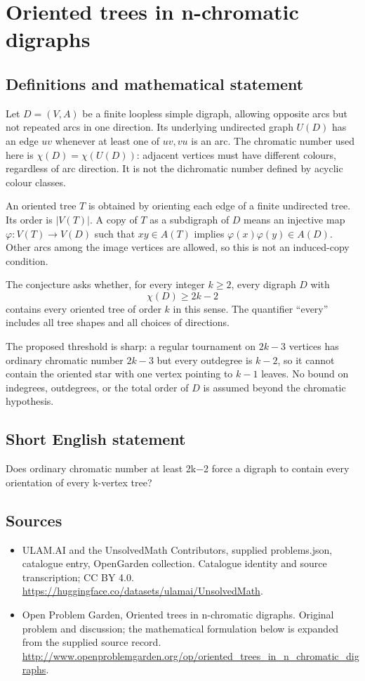 \documentclass[11pt,a4paper]{article}
\begin{document}
\section*{Oriented trees in n-chromatic digraphs}\label{statement}

\subsection{Definitions and mathematical statement}
Let $D=(V,A)$ be a finite loopless simple digraph, allowing opposite arcs
but not repeated arcs in one direction. Its underlying undirected graph
$U(D)$ has an edge $uv$ whenever at least one of $uv,vu$ is an arc.
The chromatic number used here is $\chi(D)=\chi(U(D))$: adjacent vertices
must have different colours, regardless of arc direction. It is not
the dichromatic number defined by acyclic colour classes.

An oriented tree $T$ is obtained by orienting each edge of a finite
undirected tree. Its order is $|V(T)|$. A copy of $T$ as a subdigraph of
$D$ means an injective map $\varphi:V(T)\to V(D)$ such that
$xy\in A(T)$ implies $\varphi(x)\varphi(y)\in A(D)$. Other arcs among
the image vertices are allowed, so this is not an induced-copy condition.

The conjecture asks whether, for every integer $k\ge2$, every digraph
$D$ with
\[
                            \chi(D)\ge2k-2
\]
contains every oriented tree of order $k$ in this sense. The quantifier
``every'' includes all tree shapes and all choices of directions.

The proposed threshold is sharp: a regular tournament on $2k-3$ vertices
has ordinary chromatic number $2k-3$ but every outdegree is $k-2$, so it
cannot contain the oriented star with one vertex pointing to $k-1$
leaves. No bound on indegrees, outdegrees, or the total order of $D$
is assumed beyond the chromatic hypothesis.
\subsection{Short English statement}
Does ordinary chromatic number at least 2k−2 force a digraph to contain every orientation of every k-vertex tree?
\subsection{Sources}
\begin{itemize}
\item[S1] ULAM.AI and the UnsolvedMath Contributors, supplied problems.json, catalogue entry, OpenGarden collection. Catalogue identity and source transcription; CC BY 4.0.
\url{https://huggingface.co/datasets/ulamai/UnsolvedMath}.
\item[S2] Open Problem Garden, Oriented trees in n-chromatic digraphs. Original problem and discussion; the mathematical formulation below is expanded from the supplied source record.
\url{http://www.openproblemgarden.org/op/oriented_trees_in_n_chromatic_digraphs}.
\end{itemize}
\end{document}
